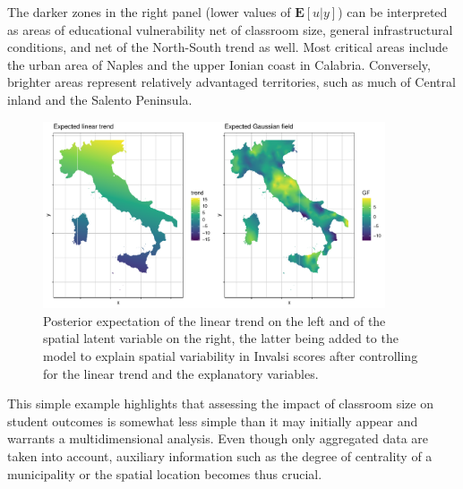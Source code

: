 \documentclass{article}%
\begin{document}
The darker zones in the right panel (lower values of $\mathbf{E}[u|y]$) can be interpreted as areas of educational vulnerability net of classroom size, general infrastructural conditions, and net of the North-South trend as well. Most critical areas include the urban area of Naples and the upper Ionian coast in Calabria. Conversely, brighter areas represent relatively advantaged territories, such as much of  Central inland and the Salento Peninsula.
\begin{figure}
  \centering
  \includegraphics[width = 0.9\textwidth]{Fig8.pdf} 
  \caption{Posterior expectation of the linear trend on the left and of the spatial latent variable on the right, the latter being added to the model to explain spatial variability in Invalsi scores after controlling for the linear trend and the explanatory variables.}
  \label{fig:trends}
\end{figure}


This simple example highlights that assessing the impact of classroom size on student outcomes is somewhat less simple than it may initially appear and warrants a multidimensional analysis. Even though only aggregated data are taken into account, auxiliary information such as the degree of centrality of a municipality or the spatial location becomes thus crucial.





\end{document}
